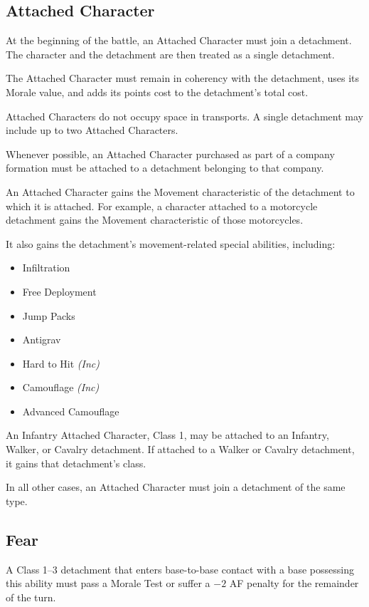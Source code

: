 \subsection{Attached Character}

At the beginning of the battle, an Attached Character must join a detachment. The character and the detachment are then treated as a single detachment.

The Attached Character must remain in coherency with the detachment, uses its Morale value, and adds its points cost to the detachment's total cost.

Attached Characters do not occupy space in transports. A single detachment may include up to two Attached Characters.

Whenever possible, an Attached Character purchased as part of a company formation must be attached to a detachment belonging to that company.

An Attached Character gains the Movement characteristic of the detachment to which it is attached. For example, a character attached to a motorcycle detachment gains the Movement characteristic of those motorcycles.

It also gains the detachment's movement-related special abilities, including:

\begin{itemize}
    \item Infiltration
    \item Free Deployment
    \item Jump Packs
    \item Antigrav
    \item Hard to Hit \textit{(Inc)}
    \item Camouflage \textit{(Inc)}
    \item Advanced Camouflage
\end{itemize}

An Infantry Attached Character, Class 1, may be attached to an Infantry, Walker, or Cavalry detachment. If attached to a Walker or Cavalry detachment, it gains that detachment's class.

In all other cases, an Attached Character must join a detachment of the same type.

\subsection{Fear}

A Class 1--3 detachment that enters base-to-base contact with a base possessing this ability must pass a Morale Test or suffer a $-2$ AF penalty for the remainder of the turn.

